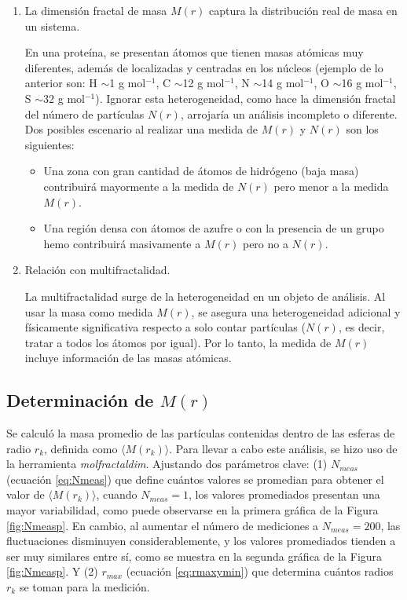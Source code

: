 	 \begin{enumerate}
	 	\item La dimensi\'{o}n fractal de masa $M(r)$ captura la distribución real de masa en un sistema. 
	 	
	 	En una proteína, se presentan átomos que tienen masas atómicas muy diferentes, además de localizadas y centradas en los núcleos (ejemplo de lo anterior son: H $\sim$1 g mol$^{-1}$, C $\sim$12 g mol$^{-1}$, N $\sim$14 g mol$^{-1}$, O $\sim$16 g mol$^{-1}$, S $\sim$32 g mol$^{-1}$). Ignorar esta heterogeneidad, como hace la dimensi\'{o}n fractal del n\'{u}mero de part\'{i}culas $N(r)$, arrojaría un análisis incompleto o diferente. Dos posibles escenario al realizar una medida de $M(r)$ y $N(r)$ son los siguientes:
	 	 
	 	 \begin{itemize}
	 	 	\item Una zona con gran cantidad de átomos de hidrógeno (baja masa) contribuirá mayormente a la medida de $N(r)$ pero menor a la medida $M(r)$.
	 	 	
	 	 	\item Una región densa con átomos de azufre o con la presencia de un grupo hemo contribuirá masivamente a $M(r)$ pero no a $N(r)$.
	 	 \end{itemize}
	 	 
		\item Relación con multifractalidad.
		
		La multifractalidad surge de la heterogeneidad en un objeto de análisis. Al usar la masa como medida $M(r)$, se asegura una heterogeneidad adicional y físicamente significativa respecto a solo contar partículas ($N(r)$, es decir, tratar a todos los átomos por igual). Por lo tanto, la medida de $M(r)$ incluye información de las masas atómicas.
	 	 
	 \end{enumerate}
	
	
	\subsection{Determinaci\'{o}n de $M(r)$}
	\label{subsec:detM(r)}	
	
	Se calcul\'{o} la masa promedio de las part\'{i}culas 
	contenidas dentro de las esferas de radio $r_k$, definida 
	como $\langle M(r_{k}) \rangle$. 
	Para llevar a cabo este an\'{a}lisis, se hizo uso de la 
	herramienta \textit{molfractaldim}. Ajustando dos par\'{a}metros
	clave: (1) $N_{meas}$ (ecuaci\'{o}n \ref{eq:Nmeas}) que define cu\'{a}ntos 
	valores se promedian para obtener el valor de $\langle M(r_{k}) \rangle$,
	cuando $N_{meas} = 1$, los valores promediados presentan una mayor 
	variabilidad, como puede observarse en la primera gr\'{a}fica de la 
	Figura \ref{fig:Nmeasp}. En cambio, al aumentar el n\'{u}mero de mediciones 
	a $N_{meas} = 200$, las fluctuaciones disminuyen considerablemente,
	 y los valores promediados tienden a ser muy similares entre s\'{i}, como se 
	 muestra en la segunda gr\'{a}fica de la Figura \ref{fig:Nmeasp}.
	 Y (2) $r_{max}$ (ecuaci\'{o}n \ref{eq:rmaxymin}) que determina 
	cu\'{a}ntos radios $r_{k}$ se toman para la medici\'{o}n.
	

